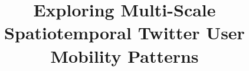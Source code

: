 \documentclass{elsart}
\begin{document}
\begin{frontmatter}



\title{Exploring Multi-Scale Spatiotemporal Twitter User Mobility Patterns}


\author{}

\address{}

\begin{abstract}
\end{abstract}

\begin{keyword}

\PACS 
\end{keyword}
\end{frontmatter}

\section{}
\label{}


\end{document}
